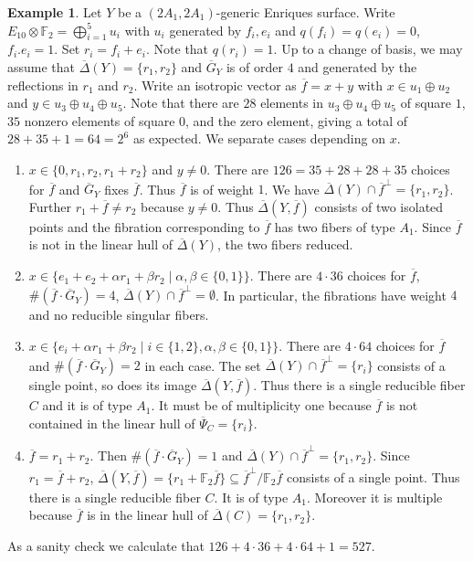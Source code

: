 \documentclass{amsart}
\theoremstyle{definition}
\newtheorem{example}[definition]{Example}
\theoremstyle{plain}
\newcommand{\FF}{\mathbb{F}}
\newcommand{\Gbar}{\overline{G}}
\begin{document}
\begin{example}
Let $Y$ be a \((2A_1,2A_1)\)-generic Enriques surface.
Write $E_{10} \otimes \FF_2= \bigoplus_{i=1}^5 u_i$ with $u_i$ generated by $f_i, e_i$ and $q(f_i)=q(e_i) =0$, \( f_i.e_i =1\).
Set $r_i = f_i+e_i$. Note that $q(r_i)=1$. Up to a change of basis, we may assume that $\overline{\Delta}(Y)=\{r_1,r_2\}$ and $\Gbar_Y$ is of order \(4\) and generated by the reflections in $r_1$ and $r_2$.
Write an isotropic vector as $\overline{f} = x+y$ with $x \in u_1 \oplus u_2$ and $y \in u_3 \oplus u_4 \oplus u_5$.
Note that there are $28$ elements in $u_3 \oplus u_4 \oplus u_5$ of square $1$, $35$ nonzero elements of square $0$, and the zero element, giving a total of $28+35+1=64=2^6$ as expected. We separate cases depending on $x$.
\begin{enumerate}
\item  \(x \in \{0, r_1, r_2, r_1+r_2\}\) and $y \neq 0$. There are \(126 = 35 + 28+28 + 35\) choices for $\overline{f}$ and $\Gbar_Y$ fixes $\overline{f}$. Thus $\overline{f}$ is of weight $1$.
We have $\overline{\Delta}(Y) \cap\overline{f}^\perp = \{r_1,r_2\}$. Further $r_1 +\overline{f} \neq r_2$ because $y\neq 0$.
Thus $\overline{\Delta}(Y,\overline{f})$ consists of two isolated points and the fibration corresponding to $\overline{f}$ has two fibers of type $A_1$.
Since $\overline{f}$ is not in the linear hull of $\overline{\Delta}(Y)$, the two fibers reduced.
\item \(x \in \{e_1+e_2 + \alpha r_1 + \beta r_2 \mid \alpha,\beta \in \{0,1\}\}\). There are \(4 \cdot 36\) choices for $\overline{f}$, $\#(\overline{f}\cdot\Gbar_Y)= 4$, $\overline{\Delta}(Y) \cap\overline{f}^\perp = \emptyset$.
In particular, the fibrations have weight $4$ and no reducible singular fibers.
\item  \(x \in \{e_i + \alpha r_1 + \beta r_2 \mid i \in \{1,2\}, \alpha,\beta \in \{0,1\}\}\).
      There are \(4\cdot 64\) choices for $\overline{f}$ and $\#(\overline{f}\cdot\Gbar_Y)=2$ in each case.
      The set $\overline{\Delta}(Y) \cap \overline{f}^\perp= \{r_i\}$ consists of a single point, so does its image $\overline{\Delta}(Y,\overline{f})$. Thus there is a single reducible fiber $C$ and it is of type $A_1$. It must be of multiplicity one because $\overline{f}$ is not contained in the linear hull of $\overline{\Psi}_C= \{r_i\}$.
\item \(\overline{f} = r_1 + r_2\). Then $\#(\overline{f}\cdot\Gbar_Y)=1$ and $\overline{\Delta}(Y) \cap \overline{f}^\perp =\{r_1,r_2\}$.
  Since $r_1 = \overline{f}+ r_2$, $\overline{\Delta}(Y,\overline{f}) = \{r_1 + \FF_2 \overline{f}\} \subseteq \overline{f}^\perp / \FF_2 \overline{f}$ consists of a single point.
  Thus there is a single reducible fiber $C$. It is of type $A_1$. Moreover it is multiple because
  $\overline{f}$ is in the linear hull of $\overline{\Delta}(C) = \{r_1, r_2\}$.
\end{enumerate}
As a sanity check we calculate that \(126 + 4 \cdot 36 + 4 \cdot 64 + 1 = 527.\)
\end{example}
\end{document}

